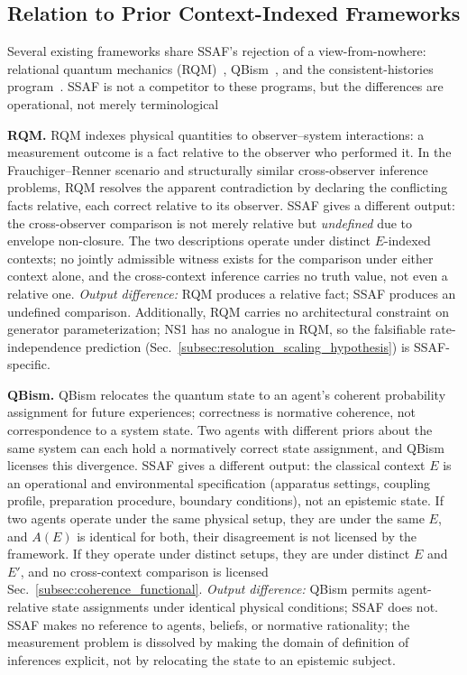 \documentclass[aps,prx,onecolumn,11pt]{revtex4-2}
\theoremstyle{plain}
\theoremstyle{definition}
\theoremstyle{remark}
\begin{document}
\subsection{Relation to Prior Context-Indexed Frameworks}
\label{subsec:comparison_frameworks}

Several existing frameworks share SSAF's rejection of a view-from-nowhere: relational quantum mechanics (RQM)~\cite{Rovelli1996,Rovelli2021}, QBism~\cite{Fuchs2014,Fuchs2017}, and the consistent-histories program~\cite{Griffiths1984,Omnes1992}. SSAF is not a competitor to these programs, but the differences are operational, not merely terminological

\textbf{RQM.}  RQM indexes physical quantities to observer--system interactions: a measurement outcome is a fact relative to the observer who performed it. In the Frauchiger--Renner scenario and structurally similar cross-observer inference problems, RQM resolves the apparent contradiction by declaring the conflicting facts relative, each correct relative to its observer. SSAF gives a different output: the cross-observer comparison is not merely relative but \emph{undefined} due to envelope non-closure. The two descriptions operate under distinct $E$-indexed contexts; no jointly admissible witness exists for the comparison under either context alone, and the cross-context inference carries no truth value, not even a relative one. \emph{Output difference:} RQM produces a relative fact; SSAF produces an undefined comparison. Additionally, RQM carries no architectural constraint on generator parameterization; NS1 has no analogue in RQM, so the falsifiable rate-independence prediction (Sec.~\ref{subsec:resolution_scaling_hypothesis}) is SSAF-specific.

\textbf{QBism.}  QBism relocates the quantum state to an agent's coherent probability assignment for future experiences; correctness is normative coherence, not correspondence to a system state. Two agents with different priors about the same system can each hold a normatively correct state assignment, and QBism licenses this divergence. SSAF gives a different output: the classical context $E$ is an operational and environmental specification (apparatus settings, coupling profile, preparation procedure, boundary conditions), not an epistemic state. If two agents operate under the same physical setup, they are under the same $E$, and $A(E)$ is identical for both, their disagreement is not licensed by the framework. If they operate under distinct setups, they are under distinct $E$ and $E'$, and no cross-context comparison is licensed Sec.~\ref{subsec:coherence_functional}. \emph{Output difference:} QBism permits agent-relative state assignments under identical physical conditions; SSAF does not. SSAF makes no reference to agents, beliefs, or normative rationality; the measurement problem is dissolved by making the domain of definition of inferences explicit, not by relocating the state to an epistemic subject.
\end{document}
